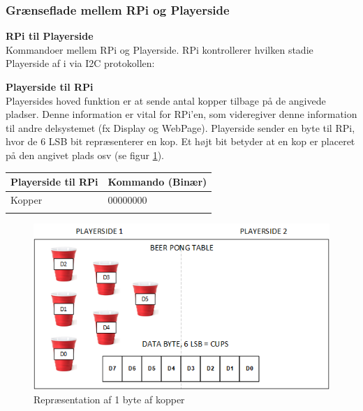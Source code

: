 \documentclass[Arkitektur/System_main.tex]{subfiles}
\begin{document}
\subsubsection{Grænseflade mellem RPi og Playerside}

\textbf{RPi til Playerside}
\\Kommandoer mellem RPi og Playerside. RPi kontrollerer hvilken stadie Playerside af i via I2C protokollen: 
\begin{table}[H]
\end{table}

\textbf{Playerside til RPi}
\\Playersides hoved funktion er at sende antal kopper tilbage på de angivede pladser. Denne information er vital for RPi'en, som videregiver denne information til andre delsystemet (fx Display og WebPage). 
Playerside sender en byte til RPi, hvor de 6 LSB bit repræsenterer en kop. Et højt bit betyder at en kop er placeret på den angivet plads osv (se figur \ref{fig:cups_setup}). 
\begin{table}[H]
\centering
\begin{tabular}{lll}
\hline
\multicolumn{1}{|l|}{\textbf{Playerside til RPi}} & \multicolumn{2}{l|}{\textbf{Kommando (Binær)}} \\ \hline
\multicolumn{1}{|l|}{Kopper} & \multicolumn{2}{l|}{00000000} \\ \hline
\multicolumn{3}{l}{}
\end{tabular}
\end{table}

\begin{figure}[H]
    \centering
    \includegraphics[width=\textwidth]{Arkitektur/Grenseflader/Graphics/cups.png}
    \caption{Repræsentation af 1 byte af kopper}
    \label{fig:cups_setup}
\end{figure}
\end{document}
